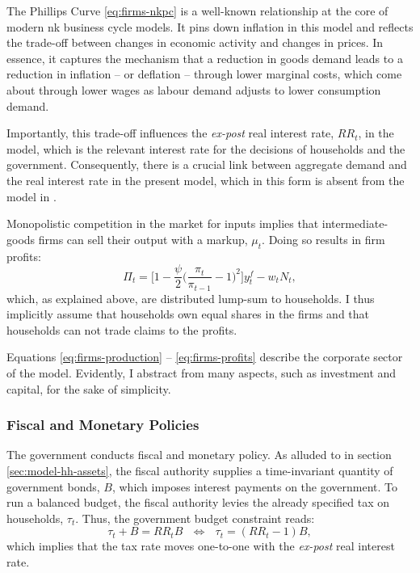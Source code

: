\documentclass[12pt]{article} %
\numberwithin{equation}{section} %
\begin{document}
The Phillips Curve \eqref{eq:firms-nkpc} is a well-known relationship at the core of modern \Gls{nk} business cycle models. It pins down inflation in this model and reflects the trade-off between changes in economic activity and changes in prices. In essence, it captures the mechanism that a reduction in goods demand leads to a reduction in inflation -- or deflation -- through lower marginal costs, which come about through lower wages as labour demand adjusts to lower consumption demand.

Importantly, this trade-off influences the \textit{ex-post} real interest rate, $RR_t$, in the model, which is the relevant interest rate for the decisions of households and the government. Consequently, there is a crucial link between aggregate demand and the real interest rate in the present model, which in this form is absent from the model in \textcite{gl2017}.

Monopolistic competition in the market for inputs implies that intermediate-goods firms can sell their output with a markup, $\mu_t$. Doing so results in firm profits:
\begin{equation}
    \Pi_t = \Bigg[ 1 - \frac{\psi}{2} \Bigg( \frac{\pi_t}{\pi_{t-1}} - 1 \Bigg)^2 \Bigg] y_t^f - w_t N_t, \label{eq:firms-profits}
\end{equation}
which, as explained above, are distributed lump-sum to households. I thus implicitly assume that households own equal shares in the firms and that households can not trade claims to the profits.

Equations \eqref{eq:firms-production} -- \eqref{eq:firms-profits} describe the corporate sector of the model. Evidently, I abstract from many aspects, such as investment and capital, for the sake of simplicity. %

\subsubsection{Fiscal and Monetary Policies}
\label{sec:model-policy}

The government conducts fiscal and monetary policy. As alluded to in section \ref{sec:model-hh-assets}, the fiscal authority supplies a time-invariant quantity of government bonds, $B$, which imposes interest payments on the government. To run a balanced budget, the fiscal authority levies the already specified tax on households, $\tau_t$. Thus, the government budget constraint reads:
\begin{equation}
    \tau_t + B = RR_t B \ \ \ \Leftrightarrow \ \ \ \tau_t = (RR_t - 1)B, \label{eq:fiscal-budget}
\end{equation}
which implies that the tax rate moves one-to-one with the \textit{ex-post} real interest rate.
\end{document}
